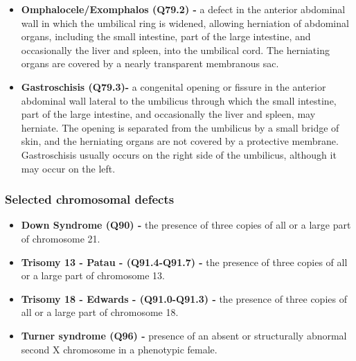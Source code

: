 \documentclass[
]{krantz}
\begin{document}
\begin{itemize}
\item
  \textbf{Omphalocele/Exomphalos (Q79.2) -} a defect in the anterior abdominal wall in which the umbilical ring is widened, allowing herniation of abdominal organs, including the small intestine, part of the large intestine, and occasionally the liver and spleen, into the umbilical cord. The herniating organs are covered by a nearly transparent membranous sac.
\item
  \textbf{Gastroschisis (Q79.3)-} a congenital opening or fissure in the anterior abdominal wall lateral to the umbilicus through which the small intestine, part of the large intestine, and occasionally the liver and spleen, may herniate. The opening is separated from the umbilicus by a small bridge of skin, and the herniating organs are not covered by a protective membrane. Gastroschisis usually occurs on the right side of the umbilicus, although it may occur on the left.
\end{itemize}

\hypertarget{section-21112}{%
\subsubsection{Selected chromosomal defects}\label{section-21112}}

\begin{itemize}
\item
  \textbf{Down Syndrome (Q90) -} the presence of three copies of all or a large part of chromosome 21.
\item
  \textbf{Trisomy 13 - Patau - (Q91.4-Q91.7) -} the presence of three copies of all or a large part of chromosome 13.
\item
  \textbf{Trisomy 18 - Edwards - (Q91.0-Q91.3) -} the presence of three copies of all or a large part of chromosome 18.
\item
  \textbf{Turner syndrome (Q96) -} presence of an absent or structurally abnormal second X chromosome in a phenotypic female.
\end{itemize}
\end{document}
